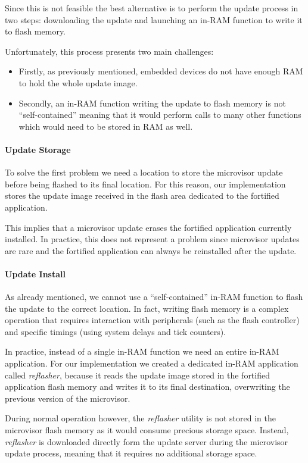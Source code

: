 \documentclass{article}
\begin{document}
Since this is not feasible the best alternative is to perform the update process in two steps: downloading the update and launching an in-RAM function to write it to flash memory.

Unfortunately, this process presents two main challenges:
\begin{itemize}
	\item Firstly, as previously mentioned, embedded devices do not have enough RAM to hold the whole update image.
	\item Secondly, an in-RAM function writing the update to flash memory is not ``self-contained'' meaning that it would perform calls to many other functions which would need to be stored in RAM as well.
\end{itemize}

\paragraph{Update Storage}
To solve the first problem we need a location to store the microvisor update before being flashed to its final location. For this reason, our implementation stores the update image received in the flash area dedicated to the fortified application.

This implies that a microvisor update erases the fortified application currently installed. In practice, this does not represent a problem since microvisor updates are rare and the fortified application can always be reinstalled after the update.

\paragraph{Update Install}
As already mentioned, we cannot use a ``self-contained'' in-RAM function to flash the update to the correct location. In fact, writing flash memory is a complex operation that requires interaction with peripherals (such as the flash controller) and specific timings (using system delays and tick counters).

In practice, instead of a single in-RAM function we need an entire in-RAM application. For our implementation we created a dedicated in-RAM application called \textit{reflasher}, because it reads the update image stored in the fortified application flash memory and writes it to its final destination, overwriting the previous version of the microvisor.

During normal operation however, the \textit{reflasher} utility is not stored in the microvisor flash memory as it would consume precious storage space. Instead, \textit{reflasher} is downloaded directly form the update server during the microvisor update process, meaning that it requires no additional storage space.
\end{document}
